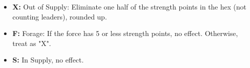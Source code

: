 \begin{minipage}{\columnwidth}
  \begin{itemize}
    \item \textbf{X:} Out of Supply: Eliminate one half of the strength points in the hex (not counting leaders), rounded up.
    \item \textbf{F:} Forage: If the force has 5 or less strength points, no effect. Otherwise, treat as "X".
    \item \textbf{S:} In Supply, no effect.

  \end{itemize}
\end{minipage}